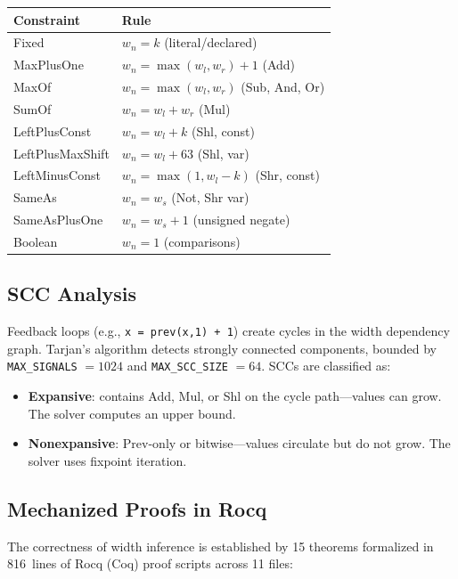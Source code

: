\documentclass[conference]{IEEEtran}
\begin{document}
\begin{center}
\footnotesize
\begin{tabular}{@{}ll@{}}
\toprule
\textbf{Constraint} & \textbf{Rule} \\
\midrule
Fixed            & $w_n = k$ (literal/declared) \\
MaxPlusOne       & $w_n = \max(w_l, w_r) + 1$ (Add) \\
MaxOf            & $w_n = \max(w_l, w_r)$ (Sub, And, Or) \\
SumOf            & $w_n = w_l + w_r$ (Mul) \\
LeftPlusConst    & $w_n = w_l + k$ (Shl, const) \\
LeftPlusMaxShift & $w_n = w_l + 63$ (Shl, var) \\
LeftMinusConst   & $w_n = \max(1, w_l - k)$ (Shr, const) \\
SameAs           & $w_n = w_s$ (Not, Shr var) \\
SameAsPlusOne    & $w_n = w_s + 1$ (unsigned negate) \\
Boolean          & $w_n = 1$ (comparisons) \\
\bottomrule
\end{tabular}
\end{center}

\subsection{SCC Analysis}

Feedback loops (e.g., \texttt{x = prev(x,1) + 1}) create cycles in the
width dependency graph.  Tarjan's algorithm detects strongly connected
components, bounded by \texttt{MAX\_SIGNALS} $= 1024$ and
\texttt{MAX\_SCC\_SIZE} $= 64$.  SCCs are classified as:

\begin{itemize}
\item \textbf{Expansive}: contains Add, Mul, or Shl on the cycle
      path---values can grow.  The solver computes an upper bound.
\item \textbf{Nonexpansive}: Prev-only or bitwise---values circulate
      but do not grow.  The solver uses fixpoint iteration.
\end{itemize}

\subsection{Mechanized Proofs in Rocq}

The correctness of width inference is established by 15 theorems
formalized in 816~lines of Rocq (Coq) proof scripts across 11 files:
\end{document}
